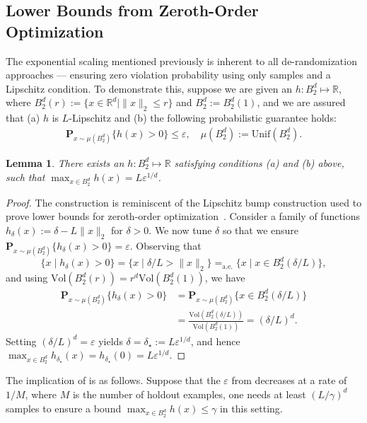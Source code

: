 \documentclass[letterpaper, 10 pt, conference]{ieeeconf}  %
\newtheorem{lemma}{Lemma}
\begin{document}
\subsection{Lower Bounds from Zeroth-Order Optimization}
The exponential scaling mentioned previously is inherent to all de-randomization approaches --- ensuring zero violation probability using only samples and a Lipschitz condition.
To demonstrate this,
suppose we are given an $h : B_2^d \mapsto \mathbb{R}$,
where $B_2^d(r) := \{ x \in \mathbb{R}^d \mid \|x\|_2 \leq r\}$ and $B_2^d := B_2^d(1)$,
and we are assured that (a) $h$ is $L$-Lipschitz and
(b) the following probabilistic guarantee holds:
\begin{align*}
    \mathbf{P}_{x \sim \mu(B_2^d)}\{ h(x) > 0 \} \leq \varepsilon, \quad \mu(B_2^d) := \mathrm{Unif}(B_2^d). \label{eq:h_prob_guarantee}
\end{align*}
\begin{lemma}
\label{lemma:lower_bound}
There exists an $h : B_2^d \mapsto \mathbb{R}$ satisfying conditions (a) and (b) above, such that $\max_{x \in B_2^d} h(x) = L \varepsilon^{1/d}$.
\end{lemma}
\begin{proof}
The construction is reminiscent of the Lipschitz bump construction used to prove lower bounds for zeroth-order optimization~\cite[cf. Theorem 1.1.2]{nesterov2018lectures}.
Consider a family of functions $h_\delta(x) := \delta - L \| x \|_2$ for $\delta > 0$.
We now tune $\delta$ so that we ensure
$\mathbf{P}_{x \sim \mu(B_2^d)}\{ h_\delta(x) > 0 \} = \varepsilon$.  Observing that
$$
    \{ x \mid h_\delta(x) > 0 \} = \{ x \mid \delta/ L > \| x \|_2 \} =_{\mathrm{a.e.}} \{ x \mid x \in B_2^d(\delta/L) \},
$$
and using $\mathrm{Vol}(B_2^d(r)) = r^d \mathrm{Vol}(B_2^d(1))$, we have
\begin{align*}
    \mathbf{P}_{x \sim \mu(B_2^d)}\{ h_\delta(x) > 0 \} &= \mathbf{P}_{x \sim \mu(B_2^d)}\{ x \in B_2^d(\delta/L) \} \\
    &= \frac{\mathrm{Vol}(B_2^d(\delta/L))}{\mathrm{Vol}(B_2^d(1))} = (\delta/L)^d.
\end{align*}
Setting $(\delta/L)^d = \varepsilon$ yields $\delta = \delta_\star := L \varepsilon^{1/d}$,
and hence $\max_{x \in B_2^d} h_{\delta_\star}(x) = h_{\delta_\star}(0) = L \varepsilon^{1/d}$.
\end{proof}

The implication of  is as follows.
Suppose that the $\varepsilon$ from  decreases at a rate of $1/M$, where $M$ is the number of holdout examples, 
one needs at least $(L/\gamma)^d$ samples to ensure a bound $\max_{x \in B_2^d} h(x) \leq \gamma$
in this setting.
\end{document}
